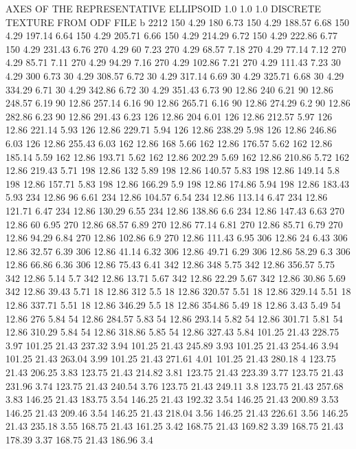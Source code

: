 AXES OF THE REPRESENTATIVE ELLIPSOID
1.0   1.0	1.0
DISCRETE TEXTURE FROM ODF FILE 
b     2212   			
150	4.29	180	    6.73
150	4.29	188.57	6.68
150	4.29	197.14	6.64
150	4.29	205.71	6.66
150	4.29	214.29	6.72
150	4.29	222.86	6.77
150	4.29	231.43	6.76
270	4.29	60	7.23
270	4.29	68.57	7.18
270	4.29	77.14	7.12
270	4.29	85.71	7.11
270	4.29	94.29	7.16
270	4.29	102.86	7.21
270	4.29	111.43	7.23
30	4.29	300	6.73
30	4.29	308.57	6.72
30	4.29	317.14	6.69
30	4.29	325.71	6.68
30	4.29	334.29	6.71
30	4.29	342.86	6.72
30	4.29	351.43	6.73
90	12.86	240	6.21
90	12.86	248.57	6.19
90	12.86	257.14	6.16
90	12.86	265.71	6.16
90	12.86	274.29	6.2
90	12.86	282.86	6.23
90	12.86	291.43	6.23
126	12.86	204	6.01
126	12.86	212.57	5.97
126	12.86	221.14	5.93
126	12.86	229.71	5.94
126	12.86	238.29	5.98
126	12.86	246.86	6.03
126	12.86	255.43	6.03
162	12.86	168	5.66
162	12.86	176.57	5.62
162	12.86	185.14	5.59
162	12.86	193.71	5.62
162	12.86	202.29	5.69
162	12.86	210.86	5.72
162	12.86	219.43	5.71
198	12.86	132	5.89
198	12.86	140.57	5.83
198	12.86	149.14	5.8
198	12.86	157.71	5.83
198	12.86	166.29	5.9
198	12.86	174.86	5.94
198	12.86	183.43	5.93
234	12.86	96	6.61
234	12.86	104.57	6.54
234	12.86	113.14	6.47
234	12.86	121.71	6.47
234	12.86	130.29	6.55
234	12.86	138.86	6.6
234	12.86	147.43	6.63
270	12.86	60	6.95
270	12.86	68.57	6.89
270	12.86	77.14	6.81
270	12.86	85.71	6.79
270	12.86	94.29	6.84
270	12.86	102.86	6.9
270	12.86	111.43	6.95
306	12.86	24	6.43
306	12.86	32.57	6.39
306	12.86	41.14	6.32
306	12.86	49.71	6.29
306	12.86	58.29	6.3
306	12.86	66.86	6.36
306	12.86	75.43	6.41
342	12.86	348	5.75
342	12.86	356.57	5.75
342	12.86	5.14	5.7
342	12.86	13.71	5.67
342	12.86	22.29	5.67
342	12.86	30.86	5.69
342	12.86	39.43	5.71
18	12.86	312	5.5
18	12.86	320.57	5.51
18	12.86	329.14	5.51
18	12.86	337.71	5.51
18	12.86	346.29	5.5
18	12.86	354.86	5.49
18	12.86	3.43	5.49
54	12.86	276	5.84
54	12.86	284.57	5.83
54	12.86	293.14	5.82
54	12.86	301.71	5.81
54	12.86	310.29	5.84
54	12.86	318.86	5.85
54	12.86	327.43	5.84
101.25	21.43	228.75	3.97
101.25	21.43	237.32	3.94
101.25	21.43	245.89	3.93
101.25	21.43	254.46	3.94
101.25	21.43	263.04	3.99
101.25	21.43	271.61	4.01
101.25	21.43	280.18	4
123.75	21.43	206.25	3.83
123.75	21.43	214.82	3.81
123.75	21.43	223.39	3.77
123.75	21.43	231.96	3.74
123.75	21.43	240.54	3.76
123.75	21.43	249.11	3.8
123.75	21.43	257.68	3.83
146.25	21.43	183.75	3.54
146.25	21.43	192.32	3.54
146.25	21.43	200.89	3.53
146.25	21.43	209.46	3.54
146.25	21.43	218.04	3.56
146.25	21.43	226.61	3.56
146.25	21.43	235.18	3.55
168.75	21.43	161.25	3.42
168.75	21.43	169.82	3.39
168.75	21.43	178.39	3.37
168.75	21.43	186.96	3.4
